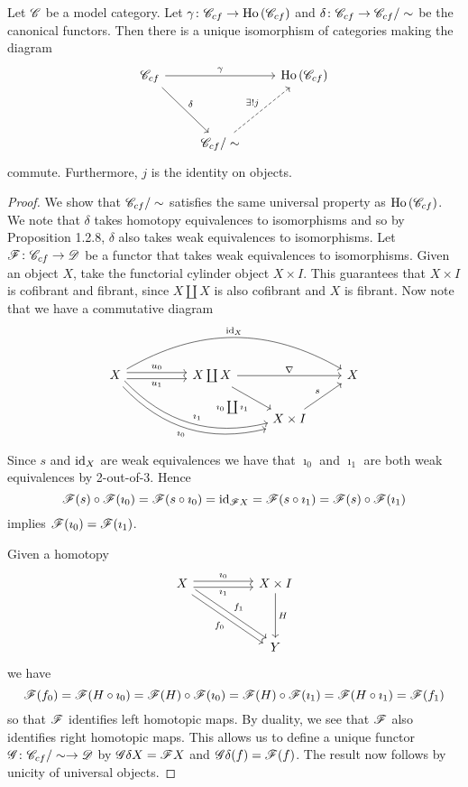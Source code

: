 \documentclass[10pt]{amsart}
\begin{document}
\begin{cor}
  Let $\mathscr{C}$ be a model category.
  Let $\gamma \colon \mathscr{C}_{cf} \to \operatorname{Ho}\left(\mathscr{C}_{cf}\right)$ and $\delta \colon \mathscr{C}_{cf} \to \mathscr{C}_{cf}/\sim$ be the canonical functors.
  Then there is a unique isomorphism of categories making the diagram
  $$\begin{tikzcd}
    \C_{cf} \arrow{rdd}{\delta} \arrow{rr}{\gamma} & & \Ho{\C_{cf}}\\
      \\
      & \C_{cf}/\sim \arrow[dashed]{uur}{\exists ! j}
  \end{tikzcd}$$
  commute.
  Furthermore, $j$ is the identity on objects.

  \begin{proof}
    We show that $\mathscr{C}_{cf}/\sim$ satisfies the same universal property as $\operatorname{Ho}\left(\mathscr{C}_{cf}\right)$.
    We note that $\delta$ takes homotopy equivalences to isomorphisms and so by Proposition 1.2.8, $\delta$ also takes weak equivalences to isomorphisms.
    Let $\mathscr{F} \colon \mathscr{C}_{cf} \to \mathscr{D}$ be a functor that takes weak equivalences to isomorphisms.
    Given an object $X$, take the functorial cylinder object $X \times I$.
    This guarantees that $X \times I$ is cofibrant and fibrant, since $X \coprod X$ is also cofibrant and $X$ is fibrant.
    Now note that we have a commutative diagram
    $$\begin{tikzcd}
      X \arrow[shift left]{rr}{u_0} \arrow[shift right,swap]{rr}{u_1} \arrow[bend left]{rrrr}{\id_X} \arrow[bend right,shift left]{rrrd}{\imath_1}\arrow[bend right,shift right,swap]{rrrd}{\imath_0}
      && 
      X \coprod X \arrow{rr}{\nabla}\arrow[swap]{rd}{\imath_0 \coprod \imath_1} 
      && X\\
      && 
      & X \times I \arrow{ur}{s}
    \end{tikzcd}$$
    Since $s$ and $\operatorname{id}_X$ are weak equivalences we have that $\imath_0$ and $\imath_1$ are both weak equivalences by 2-out-of-3.
    Hence 
    $$\mathscr{F}(s) \circ \mathscr{F}(\imath_0) = \mathscr{F}(s \circ \imath_0) = \operatorname{id}_{\mathscr{F} X} = \mathscr{F}(s \circ \imath_1) = \mathscr{F}(s) \circ \mathscr{F}(\imath_1)$$
    implies $\mathscr{F}(\imath_0) = \mathscr{F}(\imath_1)$.
    
    Given a homotopy 
    $$\begin{tikzcd}
      X \arrow[shift left]{rrdd}{f_1} \arrow[shift right,swap]{rrdd}{f_0} \arrow[shift left]{rr}{\imath_0} \arrow[shift right,swap]{rr}{\imath_1} && X \times I \arrow{dd}{H}\\
      \\
      && Y
    \end{tikzcd}$$
    we have
    $$\mathscr{F}(f_0) = 
    \mathscr{F}(H \circ \imath_0) =
    \mathscr{F}(H) \circ \mathscr{F}(\imath_0) = 
    \mathscr{F}(H) \circ \mathscr{F}(\imath_1) = 
    \mathscr{F}(H \circ \imath_1) = 
    \mathscr{F}(f_1)$$
    so that $\mathscr{F}$ identifies left homotopic maps.
    By duality, we see that $\mathscr{F}$ also identifies right homotopic maps.
    This allows us to define a unique functor $\mathscr{G} \colon \mathscr{C}_{cf}/\sim \to \mathscr{D}$ by $\mathscr{G} \delta X = \mathscr{F} X$ and $\mathscr{G} \delta(f) = \mathscr{F}(f)$.
    The result now follows by unicity of universal objects.
  \end{proof}
\end{cor}
\end{document}
